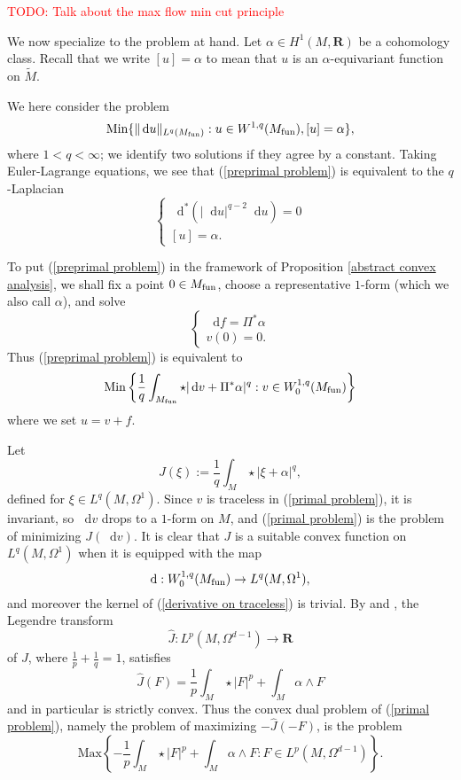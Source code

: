 \documentclass[reqno,11pt]{amsart}
\newcommand{\RR}{\mathbf{R}}
\newcommand*\dif{\mathop{}\!\mathrm{d}}
\newcommand{\Min}{\mathrm{Min}}
\newcommand{\Max}{\mathrm{Max}}
\theoremstyle{definition}
\numberwithin{equation}{section}
\newcommand\todo[1]{\textcolor{red}{TODO: #1}}
\begin{document}
\todo{Talk about the max flow min cut principle}

We now specialize to the problem at hand.
Let $\alpha \in H^1(M, \RR)$ be a cohomology class.
Recall that we write $[u] = \alpha$ to mean that $u$ is an $\alpha$-equivariant function on $\tilde M$.

We here consider the problem
\begin{equation}\label{preprimal problem}
	\Min\{\|\dif u\|_{L^q(M_{\rm fun})}: u \in W^{1, q}(M_{\rm fun}), [u] = \alpha\},
\end{equation}
where $1 < q < \infty$; we identify two solutions if they agree by a constant.
Taking Euler-Lagrange equations, we see that (\ref{preprimal problem}) is equivalent to the $q$-Laplacian 
\begin{equation}\label{qLaplace}
\begin{cases}
	\dif^*(|\dif u|^{q - 2} \dif u) = 0 \\
	[u] = \alpha.
\end{cases}
\end{equation}

To put (\ref{preprimal problem}) in the framework of Proposition \ref{abstract convex analysis}, we shall fix a point $0 \in M_{\rm fun}$, choose a representative $1$-form (which we also call $\alpha$), and solve 
$$\begin{cases}
\dif f = \Pi^* \alpha \\
v(0) = 0.
\end{cases}$$
Thus (\ref{preprimal problem}) is equivalent to
\begin{equation}\label{primal problem}
	\Min\left\{\frac{1}{q} \int_{M_{\rm fun}} \star|\dif v + \Pi^* \alpha|^q: v \in W^{1, q}_0(M_{\rm fun})\right\}
\end{equation}
where we set $u = v + f$.

Let
$$J(\xi) := \frac{1}{q} \int_M \star|\xi + \alpha|^q,$$
defined for $\xi \in L^q(M, \Omega^1)$.
Since $v$ is traceless in (\ref{primal problem}), it is invariant, so $\dif v$ drops to a $1$-form on $M$, and (\ref{primal problem}) is the problem of minimizing $J(\dif v)$.
It is clear that $J$ is a suitable convex function on $L^q(M, \Omega^1)$ when it is equipped with the map
\begin{equation}\label{derivative on traceless}
\dif: W^{1, q}_0(M_{\rm fun}) \to L^q(M, \Omega^1),
\end{equation}
and moreover the kernel of (\ref{derivative on traceless}) is trivial.
By \cite[Chapter I, (4.9)]{Ekeland99} and \cite[Chapter I, Remark 4.1]{Ekeland99}, the Legendre transform
$$\hat J: L^p(M, \Omega^{d - 1}) \to \RR$$
of $J$, where $\frac{1}{p} + \frac{1}{q} = 1$, satisfies
\begin{equation}\label{Legendre transform}
\hat J(F) = \frac{1}{p} \int_M \star |F|^p + \int_M \alpha \wedge F
\end{equation}
and in particular is strictly convex.
Thus the convex dual problem of (\ref{primal problem}), namely the problem of maximizing $-\hat J(-F)$, is the problem
\begin{equation}\label{predual problem}
\Max\left\{- \frac{1}{p} \int_M \star |F|^p + \int_M \alpha \wedge F: F \in L^p(M, \Omega^{d - 1})\right\}.
\end{equation}
\end{document}
